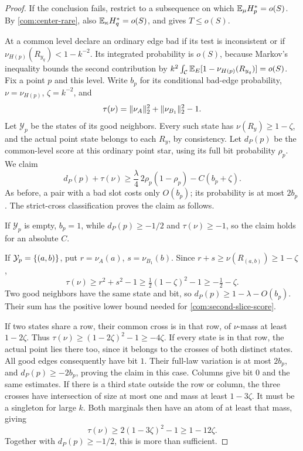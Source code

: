 \begin{proof}
If the conclusion fails, restrict to a subsequence on which
\(\mathbb E_\mu H_p^*=o(S)\). By \eqref{com:center-rare}, also
\(\mathbb E_\kappa H_q^*=o(S)\), and  gives
\(T\le o(S)\).

At a common level declare an ordinary edge bad if its test is inconsistent
or if
\(\nu_{H(p)}(R_{y_q})<1-k^{-2}\). Its integrated probability is \(o(S)\),
because Markov's inequality bounds the second contribution by
\(k^2\int_{\mathcal C}\mathbb E_E[1-\nu_{H(p)}(R_{y_q})]=o(S)\).
Fix a point \(p\) and this level. Write \(b_p\) for its conditional bad-edge
probability, \(\nu=\nu_{H(p)}\), \(\zeta=k^{-2}\), and
\[
 \tau(\nu)=\lVert \nu_A\rVert_2^2+\lVert \nu_{B_1}\rVert_2^2-1.
\]
Let \(\mathcal Y_p\) be the states of its good neighbors. Every such state
has \(\nu(R_y)\ge1-\zeta\), and the actual point state belongs to each
\(R_y\), by consistency. Let \(d_P(p)\) be the common-level score at this
ordinary point star, using its full bit probability \(\rho_p\). We claim
\begin{equation}\label{com:second-slice-score}
 d_P(p)+\tau(\nu)
 \ge\frac\lambda4\,2\rho_p(1-\rho_p)-C(b_p+\zeta).
\end{equation}
As before, a pair with a bad slot costs only \(O(b_p)\); its probability is
at most \(2b_p\). The strict-cross classification proves the claim as
follows.

If \(\mathcal Y_p\) is empty, \(b_p=1\), while \(d_P(p)\ge-1/2\) and
\(\tau(\nu)\ge-1\), so the claim holds for an absolute \(C\).

If \(\mathcal Y_p=\{(a,b)\}\), put
\(r=\nu_A(a)\), \(s=\nu_{B_1}(b)\). Since
\(r+s\ge\nu(R_{(a,b)})\ge1-\zeta\),
\[
 \tau(\nu)\ge r^2+s^2-1
        \ge\tfrac12(1-\zeta)^2-1\ge-\tfrac12-\zeta.
\]
Two good neighbors have the same state and bit, so
\(d_P(p)\ge1-\lambda-O(b_p)\). Their sum has the positive lower bound
needed for \eqref{com:second-slice-score}.

If two states share a row, their common cross is in that row, of
\(\nu\)-mass at least \(1-2\zeta\). Thus
\(\tau(\nu)\ge(1-2\zeta)^2-1\ge-4\zeta\).
If every state is in that row, the actual point lies there too, since it
belongs to the crosses of both distinct states. All good edges consequently
have bit \(1\). Their full-law variation is at most \(2b_p\), and
\(d_P(p)\ge-2b_p\), proving the claim in this case. Columns give bit \(0\)
and the same estimates. If there is a third state outside the row or column,
the three crosses have intersection of size at most one and mass at least
\(1-3\zeta\). It must be a singleton for large \(k\). Both marginals then
have an atom of at least that mass, giving
\[
 \tau(\nu)\ge2(1-3\zeta)^2-1\ge1-12\zeta.
\]
Together with \(d_P(p)\ge-1/2\), this is more than sufficient.


\end{proof}
